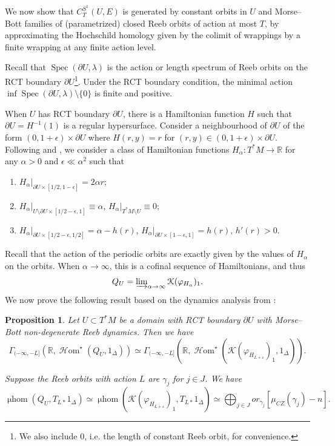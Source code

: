\documentclass[11pt]{amsart}
\numberwithin{equation}{section}
\theoremstyle{plain}
\newtheorem{Prop}[prop]{Proposition}
\theoremstyle{definition}
\theoremstyle{remark}
\newcommand{\bR} { {\mathbb{R}}}
\newcommand{\cK} { {\mathcal{K}}}
\newcommand\mhom{\operatorname{\mu hom}}
\newcommand\sHom{\operatorname{\mathscr{H}om}}
\newcommand\Spec{\operatorname{Spec}}
\begin{document}
We now show that $C_T^{S^1}(U, E)$ is generated by constant orbits in $U$ and Morse--Bott families of (parametrized) closed Reeb orbits of action at most $T$, by approximating the Hochschild homology given by the colimit of wrappings by a finite wrapping at any finite action level. 

Recall that $\Spec(\partial U, \lambda)$ is the action or length spectrum of Reeb orbits on the RCT boundary $\partial U$\footnote{We also include $0$, i.e. the length of constant  Reeb orbit, for convenience.}. Under the RCT boundary condition, the minimal action $\inf \Spec(\partial U, \lambda) \setminus\{0\}$ is finite and positive. 

When $U$ has RCT boundary $\partial U$, there is a Hamiltonian function $H$ such that $\partial U = H^{-1}(1)$ is a regular hypersurface. Consider a neighbourhood of $\partial U$ of the form $(0, 1+\epsilon) \times \partial U$ where $H(r, y) = r$ for $(r, y) \in (0, 1+\epsilon) \times \partial U$. 
Following \cite[Section 3]{Bourgeois-Oancea-automomous} and \cite[Section 2]{Cieliebak-Frauenfelder-Oancea2010}, we consider a class of Hamiltonian functions $H_{\alpha}: T^*M \to \bR$ for any $\alpha > 0$ and $\epsilon \ll \alpha^2$ such that
\begin{enumerate}
    \item $H_{\alpha}|_{\partial U \times [1/2, 1-\epsilon]} = 2\alpha r$;
    \item $H_{\alpha}|_{U \setminus \partial U \times [1/2-\epsilon, 1]} \equiv \alpha$, $H_{\alpha}|_{T^*M \setminus U} \equiv 0$;
    \item $H_\alpha|_{\partial U \times [1/2-\epsilon,1/2]} = \alpha-h(r)$, $H_\alpha|_{\partial U \times [1-\epsilon,1]} = h(r)$, $h'(r) > 0$.
\end{enumerate}
Recall that the action of the periodic orbits are exactly given by the values of $H_\alpha$ on the orbits.
When $\alpha \to \infty$, this is a cofinal sequence of Hamiltonians, and thus
\[Q_U = \varinjlim\nolimits_{\alpha \to \infty} \cK(\varphi_{H_{\alpha}})_1.\]
We now prove the following result based on the dynamics analysis from \cite[Proposition 2.5]{Cieliebak-Frauenfelder-Oancea2010}:
\begin{Prop}\label{prop:compute limit at finite action}
Let $U \subset T^*M$ be a domain with RCT boundary $\partial U$ with Morse--Bott non-degenerate Reeb dynamics. Then we have
\[\Gamma_{(-\infty,-L]}(\bR, \sHom^\star(Q_U, 1_\Delta)) \simeq \Gamma_{(-\infty,-L]}(\bR, \sHom^\star(\cK(\varphi_{H_{L+\varepsilon}})_1, 1_\Delta)).\]

Suppose the Reeb orbits with action $L$ are $\gamma_j$ for $j \in J$. We have
\[\mhom(Q_U, T_{L*}1_\Delta) \simeq \mhom(\cK(\varphi_{H_{L+\varepsilon}})_1, T_{L*}1_\Delta) \simeq \bigoplus_{j\in J}or_{\gamma_j}[\mu_{CZ}(\gamma_j)-n].\]
\end{Prop}
\end{document}
